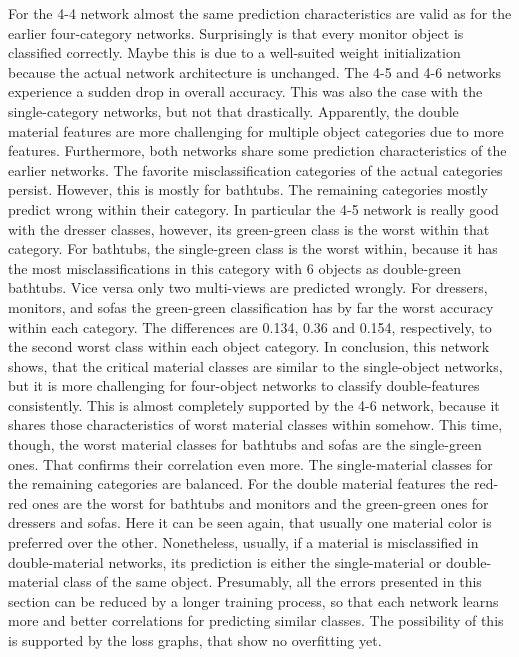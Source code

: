 For the 4-4 network almost the same prediction characteristics are valid as for the earlier four-category networks.
Surprisingly is that every monitor object is classified correctly.
Maybe this is due to a well-suited weight initialization because the actual network architecture is unchanged.
The 4-5 and 4-6 networks experience a sudden drop in overall accuracy.
This was also the case with the single-category networks, but not that drastically.
Apparently, the double material features are more challenging for multiple object categories due to more features.
Furthermore, both networks share some prediction characteristics of the earlier networks.
The favorite misclassification categories of the actual categories persist.
However, this is mostly for bathtubs.
The remaining categories mostly predict wrong within their category.
In particular the 4-5 network is really good with the dresser classes, however, its green-green class is the worst within that category.
For bathtubs, the single-green class is the worst within, because it has the most misclassifications in this category with 6 objects as double-green bathtubs.
Vice versa only two multi-views are predicted wrongly.
For dressers, monitors, and sofas the green-green classification has by far the worst accuracy within each category.
The differences are 0.134, 0.36 and 0.154, respectively, to the second worst class within each object category.
In conclusion, this network shows, that the critical material classes are similar to the single-object networks, but it is more challenging for four-object networks to classify double-features consistently.
This is almost completely supported by the 4-6 network, because it shares those characteristics of worst material classes within somehow.
This time, though, the worst material classes for bathtubs and sofas are the single-green ones.
That confirms their correlation even more.
The single-material classes for the remaining categories are balanced.
For the double material features the red-red ones are the worst for bathtubs and monitors and the green-green ones for dressers and sofas.
Here it can be seen again, that usually one material color is preferred over the other.
Nonetheless, usually, if a material is misclassified in double-material networks, its prediction is either the single-material or double-material class of the same object.
Presumably, all the errors presented in this section can be reduced by a longer training process, so that each network learns more and better correlations for predicting similar classes.
The possibility of this is supported by the loss graphs, that show no overfitting yet.

